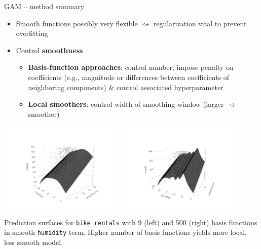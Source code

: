 \begin{frame2}{GAM -- method summary}
\begin{itemize}
    \item Smooth functions possibly very flexible $\rightsquigarrow$
    regularization vital to prevent overfitting
    \item Control \textbf{smoothness}
    \begin{itemize}
      \item \textbf{Basis-function approaches}: control number; impose penalty
      on coefficients
      (e.g., magnitude or differences between coefficients of neighboring
      components) \& control associated hyperparameter
      \item \textbf{Local smoothers}: control width of smoothing window
      (larger $\rightsquigarrow$ smoother)
    \end{itemize}
\end{itemize}

\begin{minipage}{0.65\textwidth}
\includegraphics[width=0.45\textwidth, trim=0 0 80 80, clip]{
figure/gam_bike_pred}
\includegraphics[width=0.45\textwidth, trim=80 0 0 80, clip]{
figure/gam_bike_pred_wiggly}
\hfill
\end{minipage}
\begin{minipage}{0.3\textwidth}
\small \raggedright
Prediction surfaces for \texttt{bike rentals} with 9 (left) and 500 (right)
basis functions in smooth \texttt{humidity} term.
Higher number of basis functions yields more local, less smooth model.
\end{minipage}

\end{frame2}

